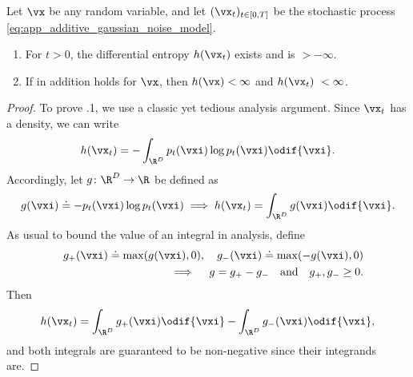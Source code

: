 \documentclass[../../book-main.tex]{subfiles}
\begin{document}
\begin{lemma}\label{lem:diffusion_entropy_exists}
    Let \(\vx\) be any random variable, and let \((\vx_{t})_{t \in
    [0, T]}\) be the stochastic process
    \eqref{eq:app_additive_gaussian_noise_model}.
    \begin{enumerate}
        \item For \(t > 0\), the differential entropy \(h(\vx_{t})\)
            exists and is \(> -\infty\).
        \item If in addition
             holds for
            \(\vx\), then \(h(\vx) < \infty\) and \(h(\vx_{t})\ < \infty\).
    \end{enumerate}
\end{lemma}
\begin{proof}
    To prove .1, we use a classic
    yet tedious analysis argument. Since \(\vx_{t}\) has a density, we can write
    \begin{equation}
        h(\vx_{t}) = -\int_{\R^{D}}p_{t}(\vxi)\log p_{t}(\vxi) \odif{\vxi}.
    \end{equation}
    Accordingly, let \(g \colon \R^{D} \to \R\) be defined as
    \begin{equation}
        g(\vxi) \doteq -p_{t}(\vxi)\log p_{t}(\vxi) \implies
        h(\vx_{t}) = \int_{\R^{D}}g(\vxi)\odif{\vxi}.
    \end{equation}
    As usual to bound the value of an integral in analysis, define
    \begin{eqnarray}
        &&g_{+}(\vxi) \doteq \max(g(\vxi), 0), \quad g_{-}(\vxi) \doteq
        \max(-g(\vxi), 0) \\ && \implies \quad g = g_{+} - g_{-}\quad
        \text{and} \quad g_{+}, g_{-} \geq 0.
    \end{eqnarray}
    Then
    \begin{equation}
        h(\vx_{t}) = \int_{\R^{D}}g_{+}(\vxi)\odif{\vxi} -
        \int_{\R^{D}}g_{-}(\vxi)\odif{\vxi},
    \end{equation}
    and both integrals are guaranteed to be non-negative since their
    integrands are.


\end{proof}
\end{document}
